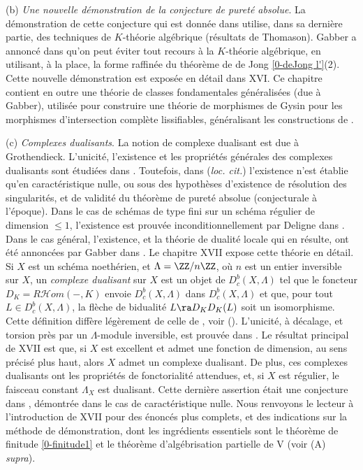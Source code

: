 \documentclass[10pt]{../fichiers-configuration-latex/smfart}
\begin{document}
\medskip (b) \textit{Une nouvelle démonstration de la conjecture de pureté absolue}. La
démonstration de cette conjecture qui est donnée dans \cite{AZUMINO@Fujiwara} utilise, dans sa
dernière partie, des techniques de $K$-théorie algébrique (résultats de Thomason). Gabber a annoncé
dans \cite{Conference-Deligne@Gabber} qu'on peut éviter tout recours à la $K$-théorie algébrique, en
utilisant, à la place, la forme raffinée du théorème de de Jong \ref{0-deJong l'}{(2)}. Cette
nouvelle démonstration est exposée en détail dans XVI. Ce chapitre contient en outre une théorie de
classes fondamentales généralisées (due à Gabber), utilisée pour construire une théorie de
morphismes de Gysin pour les morphismes d'intersection complète lissifiables, généralisant les
constructions de .

\medskip (c) \textit{Complexes dualisants}. La notion de complexe dualisant est due à Grothendieck.
L'unicité, l'existence et les propriétés générales des complexes dualisants sont étudiées dans
. Toutefois, dans (\textit{loc.  cit.}) l'existence n'est établie qu'en caractéristique
nulle, ou sous des hypothèses d'existence de résolution des singularités, et de validité du théorème
de pureté absolue (conjecturale à l'époque). Dans le cas de schémas de type fini sur un schéma
régulier de dimension $\le 1$, l'existence est prouvée inconditionnellement par Deligne dans
. Dans le cas général, l'existence, et la théorie de dualité locale qui
en résulte, ont été annoncées par Gabber dans \cite{Conference-Deligne@Gabber}. Le chapitre XVII
expose cette théorie en détail. Si $X$ est un schéma noethérien, et $\Lambda = \ZZ/n\ZZ$, où $n$ est
un entier inversible sur $X$, un \textit{complexe dualisant} sur $X$ est un objet de
$D^b_c(X,\Lambda)$ tel que le foncteur $D_K = R\mathscr{H}om(-,K)$ envoie $D^b_c(X,\Lambda)$ dans
$D^b_c(X,\Lambda)$ et que, pour tout $L \in D^b_c(X,\Lambda)$, la flèche de bidualité $L \ra
D_KD_K(L)$ soit un isomorphisme. Cette définition diffère légèrement de celle de ,
voir ().  L'unicité, à décalage, et torsion près par
un $\Lambda$-module inversible, est prouvée dans . Le résultat principal de XVII est
que, si $X$ est excellent et admet une fonction de dimension, au sens précisé plus haut, alors $X$
admet un complexe dualisant. De plus, ces complexes dualisants ont les propriétés de fonctorialité
attendues, et, si $X$ est régulier, le faisceau constant $\Lambda_X$ est dualisant. Cette dernière
assertion était une conjecture dans , démontrée dans le cas de caractéristique nulle.
Nous renvoyons le lecteur à l'introduction de XVII pour des énoncés plus complets, et des
indications sur la méthode de démonstration, dont les ingrédients essentiels sont le théorème de
finitude \ref{0-finitude1} et le théorème d'algébrisation partielle de V (voir (A) \textit{supra}).

\renewcommand\thesubsection{\textbf{\thesection.\arabic{subsection}}}

\ifx\danslelivre\undefined


\end{document}
